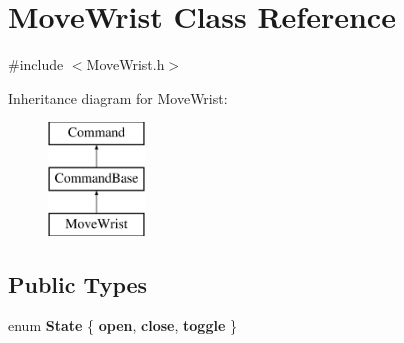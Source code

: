 \hypertarget{class_move_wrist}{}\section{Move\+Wrist Class Reference}
\label{class_move_wrist}


{\ttfamily \#include $<$Move\+Wrist.\+h$>$}

Inheritance diagram for Move\+Wrist\+:\begin{figure}[H]
\begin{center}
\leavevmode
\includegraphics[height=3.000000cm]{class_move_wrist}
\end{center}
\end{figure}
\subsection*{Public Types}
\begin{DoxyCompactItemize}
\item 
\hypertarget{class_move_wrist_a3fdfbb131a8abfcd18962448dabf1dcb}{}enum {\bfseries State} \{ {\bfseries open}, 
{\bfseries close}, 
{\bfseries toggle}
 \}\label{class_move_wrist_a3fdfbb131a8abfcd18962448dabf1dcb}

\end{DoxyCompactItemize}
